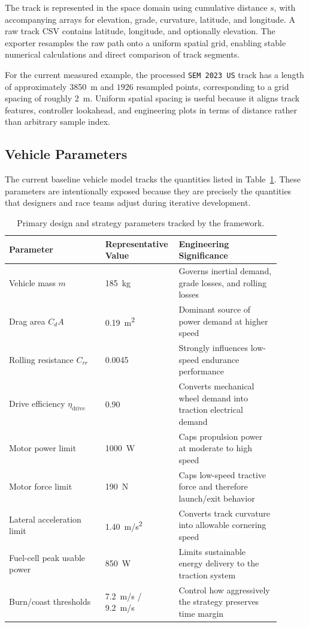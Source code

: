 \documentclass[11pt]{article}
\begin{document}
The track is represented in the space domain using cumulative distance \(s\), with accompanying arrays for elevation, grade, curvature, latitude, and longitude. A raw track CSV contains latitude, longitude, and optionally elevation. The exporter resamples the raw path onto a uniform spatial grid, enabling stable numerical calculations and direct comparison of track segments.

For the current measured example, the processed \texttt{SEM 2023 US} track has a length of approximately \SI{3850}{m} and \(1926\) resampled points, corresponding to a grid spacing of roughly \SI{2}{m}. Uniform spatial spacing is useful because it aligns track features, controller lookahead, and engineering plots in terms of distance rather than arbitrary sample index.

\subsection{Vehicle Parameters}

The current baseline vehicle model tracks the quantities listed in Table~\ref{tab:parameters}. These parameters are intentionally exposed because they are precisely the quantities that designers and race teams adjust during iterative development.

\begin{table}[H]
\centering
\caption{Primary design and strategy parameters tracked by the framework.}
\label{tab:parameters}
\begin{tabular}{p{0.34\linewidth} p{0.2\linewidth} p{0.36\linewidth}}
\toprule
\textbf{Parameter} & \textbf{Representative Value} & \textbf{Engineering Significance} \\
\midrule
Vehicle mass \(m\) & \SI{185}{kg} & Governs inertial demand, grade losses, and rolling losses \\
Drag area \(C_dA\) & \SI{0.19}{m^2} & Dominant source of power demand at higher speed \\
Rolling resistance \(C_{rr}\) & 0.0045 & Strongly influences low-speed endurance performance \\
Drive efficiency \(\eta_{\mathrm{drive}}\) & 0.90 & Converts mechanical wheel demand into traction electrical demand \\
Motor power limit & \SI{1000}{W} & Caps propulsion power at moderate to high speed \\
Motor force limit & \SI{190}{N} & Caps low-speed tractive force and therefore launch/exit behavior \\
Lateral acceleration limit & \SI{1.40}{m/s^2} & Converts track curvature into allowable cornering speed \\
Fuel-cell peak usable power & \SI{850}{W} & Limits sustainable energy delivery to the traction system \\
Burn/coast thresholds & \SI{7.2}{m/s} / \SI{9.2}{m/s} & Control how aggressively the strategy preserves time margin \\
\bottomrule
\end{tabular}
\end{table}
\end{document}
